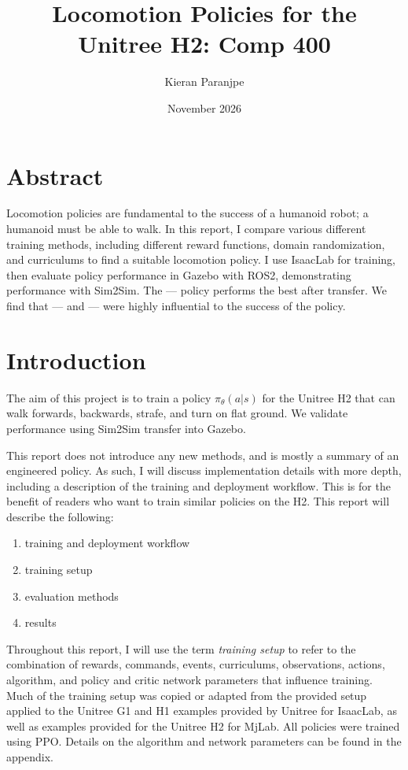 \documentclass[11pt]{article}
\title{Locomotion Policies for the Unitree H2: Comp 400}
\author{Kieran Paranjpe}
\date{November 2026}
\begin{document}
\maketitle

\section{Abstract}
Locomotion policies are fundamental to the success of a humanoid robot; a humanoid must be able to walk. In this report, I compare various different training methods, including different reward functions, domain randomization, and curriculums to find a suitable locomotion policy. I use IsaacLab for training, then evaluate policy performance in Gazebo with ROS2, demonstrating performance with Sim2Sim. The --- policy performs the best after transfer. We find that --- and --- were highly influential to the success of the policy.

\section{Introduction}
The aim of this project is to train a policy $\pi_\theta(a|s)$ for the Unitree H2 that can walk forwards, backwards, strafe, and turn on flat ground. We validate performance using Sim2Sim transfer into Gazebo.

This report does not introduce any new methods, and is mostly a summary of an engineered policy. As such, I will discuss implementation details with more depth, including a description of the training and deployment workflow. This is for the benefit of readers who want to train similar policies on the H2. This report will describe the following:
\begin{enumerate}
    \item training and deployment workflow
    \item training setup
    \item evaluation methods
    \item results
\end{enumerate}
Throughout this report, I will use the term \textit{training setup} to refer to the combination of rewards, commands, events, curriculums, observations, actions, algorithm, and policy and critic network parameters that influence training. Much of the training setup was copied or adapted from the provided setup applied to the Unitree G1 and H1 examples provided by Unitree for IsaacLab, as well as examples provided for the Unitree H2 for MjLab. All policies were trained using PPO. Details on the algorithm and network parameters can be found in the appendix.
\end{document}
